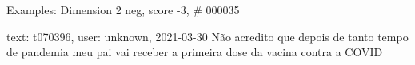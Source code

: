 \begin{frame}{Examples: Dimension 2 neg, score -3, \# 000035}
\footnotesize
\begin{alertblock}{text: t070396, user: unknown, 2021-03-30}
Não acredito que depois de tanto tempo de pandemia meu pai vai receber a 
primeira dose da vacina contra a COVID 
\textbf{}  
  
\end{alertblock}
\end{frame}
